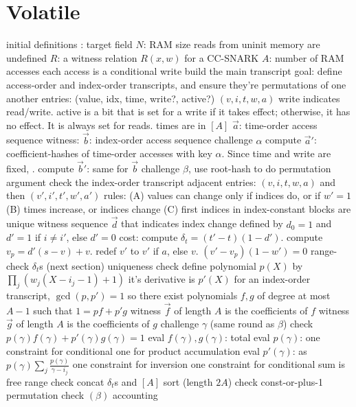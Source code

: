 \section{Volatile}
\begin{outline}
\1 initial definitions
  \2 \FF: target field
  \2 $N$: RAM size
  \2 reads from uninit memory are undefined
  \2 $R$: a witness relation $R(x, w)$ for a CC-SNARK
    \3 $A$: number of RAM accesses
      \4 each access is a conditional write
\1 build the main transcript
  \2 goal: define access-order and index-order transcripts, and ensure they're
  permutations of one another
  \2 entries: (value, idx, time, write?, active?) $(v, i, t, w, a)$
    \3 write indicates read/write.
    \3 active is a bit that is set for a write if it takes effect; otherwise, it has no effect. It is always set for reads.
    \3 times are in $[A]$
  \2 $\vec a$: time-order access sequence
  \2 witness: $\vec b$: index-order access sequence
  \2 challenge $\alpha$
  \2 compute $\vec a'$: coefficient-hashes of time-order accesses with key
  $\alpha$.
    \3 Since time and write are fixed, .
  \2 compute $\vec b'$: same for $\vec b$
    \3 
  \2 challenge $\beta$, use root-hash to do permutation argument
    \3 
\1 check the index-order transcript
  \2 adjacent entries: $(v, i, t, w, a)$ and then $(v', i', t', w', a')$
  \2 rules:
    \3 (A) values can change only if indices do, or if $w'=1$
    \3 (B) times increase, or indices change
    \3 (C) first indices in index-constant blocks are unique
  \2 witness sequence $\vec d$ that indicates index change
    \3 defined by $d_0=1$ and $d'=1$ if $i \ne i'$, else $d'=0$
    \3 cost: 
  \2 compute $\delta_t = (t'-t)(1-d')$. 
  \2 compute $v_p = d'(s-v) + v$. 
  \2 redef $v'$ to $v'$ if $a$, else $v$. 
  \2 $(v'-v_p)(1-w')=0$ 
  \2 range-check $\delta_t$s (next section)
\1 uniqueness check
  \2 define polynomial $p(X)$ by $\prod_j (w_j(X - i_j - 1) + 1)$
  \2 it's derivative is $p'(X)$
  \2 for an index-order transcript, $\gcd(p,p')=1$
    \3 so there exist polynomials $f,g$ of degree at most $A-1$ such that $1 = pf + p'g$
  \2 witness $\vec f$ of length $A$ is the coefficients of $f$
  \2 witness $\vec g$ of length $A$ is the coefficients of $g$
  \2 challenge $\gamma$ (same round as $\beta$)
  \2 check $p(\gamma)f(\gamma) + p'(\gamma)g(\gamma)=1$
  \2 eval $f(\gamma), g(\gamma)$:  total
  \2 eval $p(\gamma)$: 
    \3 one constraint for conditional
    \3 one for product accumulation
  \2 eval $p'(\gamma)$: 
    \3 as $p(\gamma)\sum_j\frac{p(\gamma)}{\gamma-i_j}$
    \3 one constraint for inversion
    \3 one constraint for conditional
    \3 sum is free
\1 range check
  \2 concat $\delta_t$s and $[A]$
  \2 sort (length $2A$)
  \2 check const-or-plus-1 
  \2 permutation check $(\beta)$ 
\1 accounting
  \2 
\end{outline}

